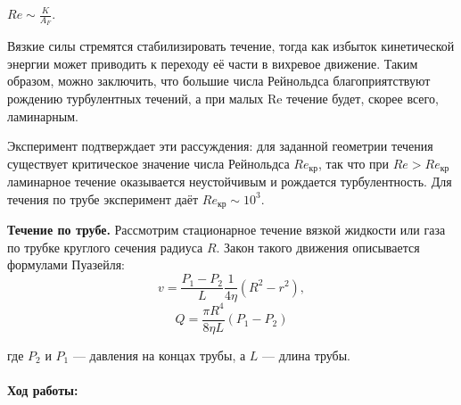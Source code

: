 \documentclass[10pt]{article}
\begin{document}
\begin{center}
    $Re \sim \frac{K}{A_F}$.
\end{center}
\small{
Вязкие силы стремятся стабилизировать течение, тогда как избыток кинетической энергии может приводить к переходу её части в вихревое движение. Таким образом, можно заключить, что большие числа Рейнольдса благоприятствуют рождению турбулентных течений, а при малых Re течение будет, скорее всего, ламинарным.}

Эксперимент подтверждает эти рассуждения: для заданной геометрии течения существует критическое значение числа Рейнольдса $Re_{\text{кр}}$, так что при $Re > Re_{\text{кр}}$ ламинарное течение оказывается неустойчивым и рождается турбулентность. Для течения по трубе эксперимент даёт $Re_{\text{кр}}\sim 10^3.$

\textbf{Течение по трубе.} Рассмотрим стационарное течение вязкой жидкости или газа по трубке круглого сечения радиуса $R$. Закон такого движения описывается формулами Пуазейля:
\begin{equation}
        v = \frac{P_1 - P_2}{L} \frac{1}{4 \eta} (R^2 - r^2),
\end{equation}
\begin{equation}
    Q = \frac{\pi R^4}{8 \eta L} (P_1 - P_2)
\end{equation}

где $P_2$ и $P_1$ — давления на концах трубы, а $L$ — длина трубы. \\ \\

\textbf{Ход работы:}
\end{document}
